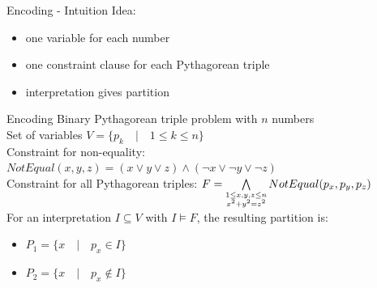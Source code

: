 \documentclass[c,8pt,xcolor...,x11names]{beamer}
\begin{document}
\begin{frame}{Encoding - Intuition}
	Idea:
	\begin{itemize}
		\item one variable for each number
		\pause
		\item one constraint clause for each Pythagorean triple
		\pause
		\item interpretation gives partition
	\end{itemize}
\end{frame}

\begin{frame}{Encoding}
	Binary Pythagorean triple problem with $n$ numbers \\
	\vspace{5px}
	\pause
	Set of variables $V = \{ p_k \quad | \quad 1 \leq k \leq n \}$ \\
	\vspace{5px}
	\pause
	Constraint for non-equality: $NotEqual(x,y,z) = (x \vee y \vee z) \wedge (\neg x \vee \neg y \vee \neg z) $ \\
	\vspace{5px}
	\pause
	Constraint for all Pythagorean triples: $F = \bigwedge\limits_{\small\substack{1 \leq x,y,z \leq n \\ x^2+y^2=z^2}} NotEqual(p_x,p_y,p_z)$ \\
	\vspace{10px}
	\pause
	For an interpretation $I \subseteq V$ with $I \models F$, the resulting partition is:
	\begin{itemize}
		\item $ P_1 = \{ x \quad | \quad p_x \in I \}$
		\item $ P_2 = \{ x \quad | \quad p_x \notin I \} $
	\end{itemize}
\end{frame}
\end{document}
